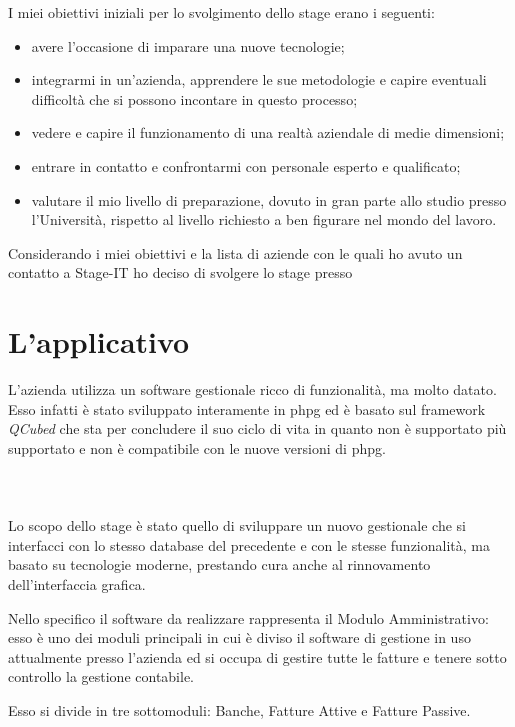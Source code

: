	I miei obiettivi iniziali per lo svolgimento dello stage erano i seguenti:
	\begin{itemize}
		\item avere l’occasione di imparare una nuove tecnologie;
		\item integrarmi in un'azienda, apprendere le sue metodologie e capire eventuali difficoltà che si possono incontare in questo processo;
		\item vedere e capire il funzionamento di una realtà aziendale di medie dimensioni;
		\item entrare in contatto e confrontarmi con personale esperto e qualificato;
		\item valutare il mio livello di preparazione, dovuto in gran parte allo studio presso l'Università, rispetto al livello richiesto a ben figurare nel mondo del lavoro.
	\end{itemize}
	\vspace{0.5cm}
	Considerando i miei obiettivi e la lista di aziende con le quali ho avuto un contatto
	a Stage-IT ho deciso di svolgere lo stage presso \vic{}


\section{L'applicativo}
	L’azienda utilizza un software gestionale ricco di funzionalità, ma molto datato.
	Esso infatti è stato sviluppato interamente in \gls{phpg}\cite{site:php} ed è basato sul framework \textit{QCubed}\cite{site:QCubed} che
	sta per concludere il suo ciclo di vita in quanto non è supportato più supportato e non è compatibile con le nuove versioni di \gls{phpg}.
	\paragraph{\\}
	Lo scopo dello stage è stato quello di sviluppare un nuovo gestionale che si interfacci con lo stesso database del precedente e con le stesse
	funzionalità, ma basato su tecnologie moderne, prestando cura anche al rinnovamento
	dell’interfaccia grafica.
	
	Nello specifico il software da realizzare rappresenta il Modulo Amministrativo: esso è uno dei moduli principali in cui è diviso il
	software di gestione in uso attualmente presso l’azienda ed si occupa di gestire tutte le fatture e tenere sotto controllo la gestione contabile.
	
	Esso si divide in tre sottomoduli: Banche, Fatture Attive e Fatture Passive.
	
